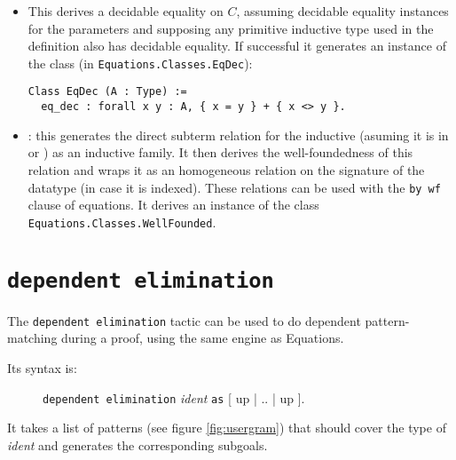 \begin{itemize}
\item {}
  This derives a decidable equality on $C$, assuming decidable equality 
  instances for the parameters and supposing any primitive inductive
  type used in the definition also has decidable equality. If
  successful it generates an instance of the class (in \texttt{Equations.Classes.EqDec}):
\begin{verbatim}
Class EqDec (A : Type) :=
  eq_dec : forall x y : A, { x = y } + { x <> y }.
\end{verbatim}
  
\item {}: this generates the direct subterm relation for the
  inductive (asuming it is in  or ) as an inductive family.
  It then derives the well-foundedness of this relation and wraps it
  as an homogeneous relation on the signature of the datatype (in case
  it is indexed). These relations can be used with the \texttt{by wf}
  clause of equations. It derives an instance of the class
  \texttt{Equations.Classes.WellFounded}.

\end{itemize}

\section{\texttt{dependent elimination}}

The \texttt{dependent elimination} tactic can be used to do dependent
pattern-matching during a proof, using the same engine as Equations.

Its syntax is:
\begin{figure}[h]
  \texttt{dependent elimination} \textit{ident} \texttt{as} [ up | .. | up ].
\end{figure}

It takes a list of patterns (see figure \ref{fig:usergram}) that should cover the type of \textit{ident}
and generates the corresponding subgoals.

